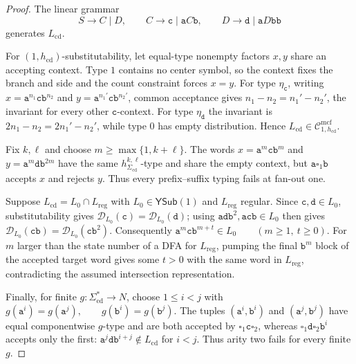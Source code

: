 \documentclass[11pt]{article}
\numberwithin{equation}{section}
\theoremstyle{plain}
\theoremstyle{definition}
\theoremstyle{remark}
\newcommand{\Cmcf}[2]{\mathcal{C}^{\mathrm{mcf}}_{#1,#2}}
\newcommand{\D}{\mathcal{D}}
\newcommand{\blank}{\square}
\newcommand{\YSub}[1]{\mathsf{YSub}(#1)}
\theoremstyle{plain}
\begin{document}
\begin{proof}
The linear grammar
\[
  S\to C\mid D,\qquad
  C\to\mathtt c\mid\mathtt a C\mathtt b,\qquad
  D\to\mathtt d\mid\mathtt a D\mathtt b\mathtt b
\]
generates $L_{\mathrm{cd}}$.

For $(1,h_{\mathrm{cd}})$-substitutability, let equal-type nonempty factors
$x,y$ share an accepting context.  Type $1$ contains no center symbol, so the
context fixes the branch and side and the count constraint forces $x=y$.
For type $\eta_{\mathtt c}$, writing
$x=\mathtt a^{n_1}\mathtt c\mathtt b^{n_2}$ and
$y=\mathtt a^{n_1'}\mathtt c\mathtt b^{n_2'}$, common acceptance gives
$n_1-n_2=n_1'-n_2'$, the invariant for every other $\mathtt c$-context.
For type $\eta_{\mathtt d}$ the invariant is
$2n_1-n_2=2n_1'-n_2'$, while type $0$ has empty distribution.  Hence
$L_{\mathrm{cd}}\in\Cmcf{1}{h_{\mathrm{cd}}}$.

Fix $k,\ell$ and choose $m\ge\max\{1,k+\ell\}$.  The words
$x=\mathtt a^m\mathtt c\mathtt b^m$ and
$y=\mathtt a^m\mathtt d\mathtt b^{2m}$ have the same
$h_{\Sigma_{\mathrm{cd}}}^{k,\ell}$-type and share the empty context, but
$\mathtt a\blank_1\mathtt b$ accepts $x$ and rejects $y$.  Thus every
prefix--suffix typing fails at fan-out one.

Suppose $L_{\mathrm{cd}}=L_0\cap L_{\mathrm{reg}}$ with
$L_0\in\YSub{1}$ and $L_{\mathrm{reg}}$ regular.  Since
$\mathtt c,\mathtt d\in L_0$, substitutability gives
$\D_{L_0}(\mathtt c)=\D_{L_0}(\mathtt d)$; using
$\mathtt a\mathtt d\mathtt b^2,\mathtt a\mathtt c\mathtt b\in L_0$ then gives
$\D_{L_0}(\mathtt c\mathtt b)=\D_{L_0}(\mathtt c\mathtt b^2)$.
Consequently
\(\mathtt a^m\mathtt c\mathtt b^{m+t}\in L_0 \qquad(m\ge1,\ t\ge0).\)
For $m$ larger than the state number of a DFA for $L_{\mathrm{reg}}$, pumping
the final $\mathtt b^m$ block of the accepted target word gives some $t>0$
with the same word in $L_{\mathrm{reg}}$, contradicting the assumed
intersection representation.

Finally, for finite $g:\Sigma_{\mathrm{cd}}^*\to N$, choose $1\le i<j$ with
\(g(\mathtt a^i)=g(\mathtt a^j),\qquad g(\mathtt b^i)=g(\mathtt b^j).\)
The tuples $(\mathtt a^i,\mathtt b^i)$ and
$(\mathtt a^j,\mathtt b^j)$ have equal componentwise $g$-type and are both
accepted by $\blank_1\mathtt c\blank_2$, whereas
$\blank_1\mathtt d\blank_2\mathtt b^i$ accepts only the first:
$\mathtt a^j\mathtt d\mathtt b^{i+j}\notin L_{\mathrm{cd}}$ for $i<j$.
Thus arity two fails for every finite $g$.
\end{proof}
\end{document}
